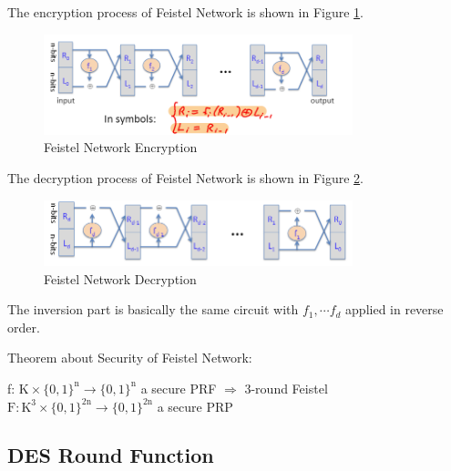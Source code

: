 The encryption process of Feistel Network is shown in Figure \ref{fig: 03 Feistel Network Encryption}.

\begin{figure}[h]
    \centering
    \includegraphics[width=0.8\textwidth]{Stanford_Crypto_1/fig/03_block_cipher/Feistel Network Encryption.png}
    \caption{Feistel Network Encryption}
    \label{fig: 03 Feistel Network Encryption}
\end{figure}


The decryption process of Feistel Network is shown in Figure \ref{fig: 03 Feistel Network Decryption}.

\begin{figure}[h]
    \centering
    \includegraphics[width=0.8\textwidth]{Stanford_Crypto_1/fig/03_block_cipher/Feistel Network Decryption.png}
    \caption{Feistel Network Decryption}
    \label{fig: 03 Feistel Network Decryption}
\end{figure}

The inversion part is basically the same circuit with $f_1 , \cdots f_d$ applied in reverse order.

\begin{theorem}  Theorem about Security of Feistel Network:

    f: $\mathrm{K} \times\{0,1\}^{\mathrm{n}} \rightarrow\{0,1\}^{\mathrm{n}}$ a secure PRF
    $\Rightarrow$ 3-round Feistel $\mathrm{F}: \mathrm{K}^{3} \times\{0,1\}^{2 \mathrm{n}} \rightarrow\{0,1\}^{2 \mathrm{n}}$ a secure PRP
    
\end{theorem}

\subsection{DES Round Function}

